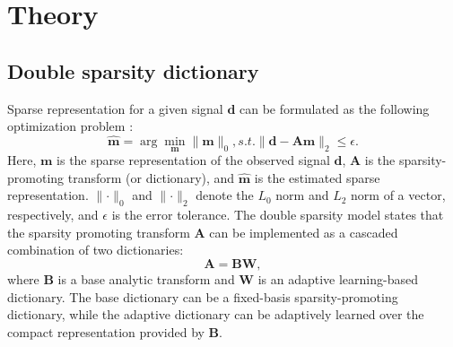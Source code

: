 



\section{Theory}
\subsection{Double sparsity dictionary}
Sparse representation for a given signal $\mathbf{d}$ can be formulated as the following optimization problem \cite[]{ron2010,ophir2011}:
\begin{equation}
\label{eq:eq1}
\hat{\mathbf{m}} = \arg \min_{\mathbf{m}} \parallel\mathbf{m} \parallel_0, s.t. \parallel \mathbf{d}-\mathbf{A}\mathbf{m}\parallel_2 \le \epsilon.
\end{equation}
Here, $\mathbf{m}$ is the sparse representation of the observed signal $\mathbf{d}$, $\mathbf{A}$ is the sparsity-promoting transform (or dictionary), and $\hat{\mathbf{m}}$ is the estimated sparse representation.
$\parallel \cdot \parallel_0$ and $\parallel \cdot \parallel_2$ denote the $L_0$ norm and $L_2$ norm of a vector, respectively, and $\epsilon$ is the error tolerance.
The double sparsity model states that the sparsity promoting transform $\mathbf{A}$ can be implemented as a cascaded combination of two dictionaries:
\begin{equation}
\label{eq:eq2}
\mathbf{A} = \mathbf{BW},
\end{equation}
where $\mathbf{B}$ is a base analytic transform and $\mathbf{W}$ is an adaptive learning-based dictionary.  The base dictionary can be a fixed-basis sparsity-promoting dictionary, while the adaptive dictionary can be adaptively learned over the compact representation provided by $\mathbf{B}$. 

